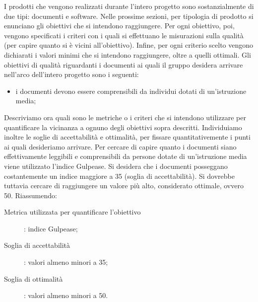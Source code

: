 		  \label{subsec:obiettiviprodotto}
			I prodotti che vengono realizzati durante l'intero progetto sono sostanzialmente di due tipi: documenti e software. Nelle prossime sezioni, per tipologia di prodotto si enunciano gli obiettivi che si intendono raggiungere. Per ogni obiettivo, poi, vengono specificati i criteri con i quali si effettuano le misurazioni sulla qualità (per capire quanto si è vicini all'obiettivo). Infine, per ogni criterio scelto vengono dichiarati i valori minimi che si intendono raggiungere, oltre a quelli ottimali.
				Gli obiettivi di qualità riguardanti i documenti ai quali il gruppo \groupname{} desidera arrivare nell'arco dell'intero progetto sono i seguenti:
				\begin{itemize}
					\item i documenti devono essere comprensibili da individui dotati di un'istruzione media;
				\end{itemize}
				Descriviamo ora quali sono le metriche o i criteri che si intendono utilizzare per quantificare la vicinanza a ognuno degli obiettivi sopra descritti. Individuiamo inoltre le soglie di accettabilità e ottimalità, per fissare quantitativemente i punti ai quali desideriamo arrivare.
					Per cercare di capire quanto i documenti siano effettivamente leggibili e comprensibili da persone dotate di un'istruzione media viene utilizzato l'indice Gulpease. Si desidera che i documenti posseggano costantemente un indice maggiore a 35 (soglia di accettabilità). Si dovrebbe tuttavia cercare di raggiungere un valore più alto, considerato ottimale, ovvero 50. Riassumendo:
					\begin{description}
						\item[Metrica utilizzata per quantificare l'obiettivo]: indice Gulpease;
						\item[Soglia di accettabilità]: valori almeno minori a 35;
						\item[Soglia di ottimalità]: valori almeno minori a 50.
					\end{description}
